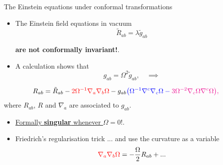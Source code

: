 \documentclass[10pt]{beamer}
\theoremstyle{plain}
\begin{document}
\begin{frame}{The Einstein equations under conformal transformations}
\begin{itemize}
   \item The Einstein field equations in vacuum
     \vspace{-2mm}
\[
\tilde{R}_{ab} = \lambda \tilde{g}_{ab}
\]
 \vspace{-5mm}
 \begin{center}\large{\textbf{are not conformally invariant!}}.
 \end{center}
 \pause
\vspace{2mm}
\item A calculation shows that
\[
g_{ab} = \Omega^2 \tilde{g}_{ab}, \quad \implies
\]\vspace{-3mm}
\end{itemize}
\[
R_{ab} = \tilde{R}_{ab} -
\textcolor{red}{ 2\Omega^{-1} {\nabla}_a {\nabla}_b \Omega }
- {g}_{ab}\color{blue}{\big( \Omega^{-1} {\nabla}^c {\nabla}_c \Omega}
- \color{magenta}{3\Omega^{-2} {\nabla}_c \Omega {\nabla}^c \Omega\big)} ,
\]
where $R_{ab}$, $R$ and $\nabla_a$ are associated to
$g_{ab}$.
 \vspace{3mm}

\begin{itemize}
\item  \underline{Formally \textbf{singular}  whenever $\Omega=0$}!.
  \vspace{3mm}
  \pause
\item Friedrich's regularisation trick ... and  use the curvature as a variable
  \vspace{-2mm}
  \[ \textcolor{red}{{\nabla}_a {\nabla}_b \Omega}  = -\frac{\Omega}{2} {R}_{ab} + ...\]
  \vspace{-7mm}

\end{itemize}
\end{frame}


\end{document}
